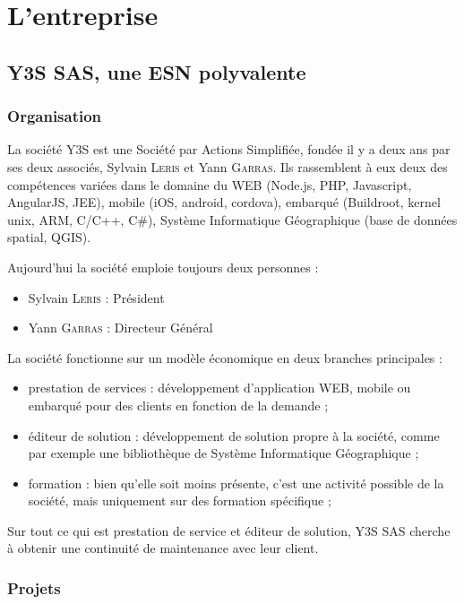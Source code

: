 \chapter{L'entreprise}
\label{chap:y3s}

\section{Y3S SAS, une ESN polyvalente}

\subsection{Organisation}
La société Y3S est une Société par Actions Simplifiée, fondée il y a
deux ans par ses deux associés, Sylvain \textsc{Leris} et Yann
\textsc{Garras}. Ils rassemblent à eux deux des compétences variées
dans le domaine du WEB (Node.js, PHP, Javascript, AngularJS, JEE),
mobile (iOS, android, cordova), embarqué (Buildroot, kernel unix, ARM,
C/C++, C\#), Système Informatique Géographique (base de données
spatial, QGIS).

Aujourd'hui la société emploie toujours deux personnes :
\begin{itemize}
\item Sylvain \textsc{Leris} : Président
\item Yann \textsc{Garras} : Directeur Général
\end{itemize}

La société fonctionne sur un modèle économique en deux branches
principales :
\begin{itemize}
\item prestation de services : développement d'application WEB, mobile
  ou embarqué pour des clients en fonction de la demande ;
\item éditeur de solution : développement de solution propre à la
  société, comme par exemple une bibliothèque de Système Informatique
  Géographique ;
\item formation : bien qu'elle soit moins présente, c'est une activité
  possible de la société, mais uniquement sur des formation
  spécifique ;
\end{itemize}

Sur tout ce qui est prestation de service et éditeur de solution, Y3S
SAS cherche à obtenir une continuité de maintenance avec leur client.

\subsection{Projets}

